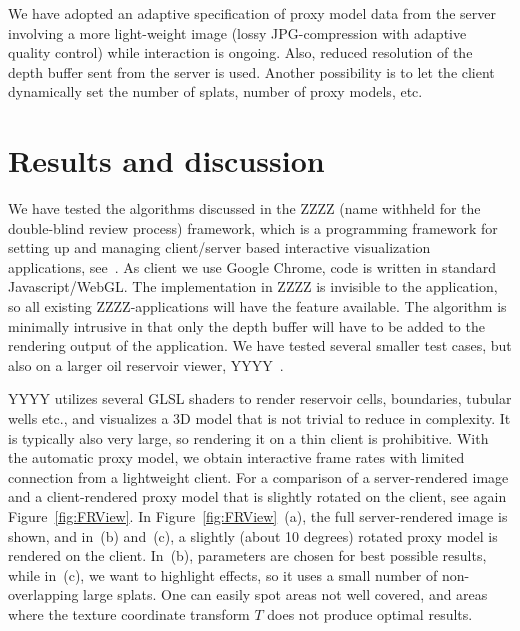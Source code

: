 \documentclass[10pt,conference,compsocconf]{IEEEtran}
\begin{document}
We have adopted an adaptive specification of proxy model data from the server
involving a more light-weight image (lossy JPG-compression with adaptive quality
control) while interaction is ongoing.  Also, reduced resolution of the depth
buffer sent from the server is used. Another possibility is to let the client
dynamically set the number of splats, number of proxy models, etc.


\section{Results and discussion}

We have tested the algorithms discussed in the ZZZZ (name withheld for the
double-blind review process) framework, which is a programming framework for
setting up and managing client/server based interactive visualization
applications, see~\cite{tinia}. As client we use Google Chrome, code is written
in standard Javascript/WebGL.  The implementation in ZZZZ is invisible to the
application, so all existing ZZZZ-applications will have the feature
available. The algorithm is minimally intrusive in that only the depth buffer
will have to be added to the rendering output of the application. We have tested
several smaller test cases, but also on a larger oil reservoir viewer,
YYYY~\cite{cloudviz}.

YYYY utilizes several GLSL shaders to render reservoir cells, boundaries,
tubular wells etc., and visualizes a 3D model that is not trivial to reduce in
complexity. It is typically also very large, so rendering it on a thin client is
prohibitive. With the automatic proxy model, we obtain interactive frame rates
with limited connection from a lightweight client. For a comparison of a
server-rendered image and a client-rendered proxy model that is slightly rotated
on the client, see again Figure~\ref{fig:FRView}. In
Figure~\ref{fig:FRView}~(a), the full server-rendered image is shown, and in~(b)
and~(c), a slightly (about 10 degrees) rotated proxy model is rendered on the
client. In~(b), parameters are chosen for best possible results, while in~(c),
we want to highlight effects, so it uses a small number of non-overlapping large
splats. One can easily spot areas not well covered, and areas where the texture
coordinate transform $T$ does not produce optimal results.



\end{document}
